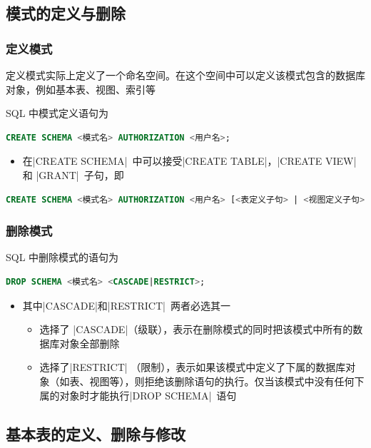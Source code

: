 \subsection{模式的定义与删除}

\subsubsection{定义模式}
定义模式实际上定义了一个命名空间。在这个空间中可以定义该模式包含的数据库对象，例如基本表、视图、索引等

SQL 中模式定义语句为
\begin{lstlisting}[language=sql]
CREATE SCHEMA <模式名> AUTHORIZATION <用户名>;
\end{lstlisting}
\begin{itemize}
    \item 在\sverb|CREATE SCHEMA|\ 中可以接受\sverb|CREATE TABLE|，\sverb|CREATE VIEW| 和 \sverb|GRANT|\ 子句，即
\end{itemize}
\begin{lstlisting}[language=sql]
CREATE SCHEMA <模式名> AUTHORIZATION <用户名> [<表定义子句> | <视图定义子句> | <授权定义子句>]
\end{lstlisting}

\subsubsection{删除模式}
SQL 中删除模式的语句为
\begin{lstlisting}[language=sql]
DROP SCHEMA <模式名> <CASCADE|RESTRICT>;
\end{lstlisting}

\begin{itemize}
    \item 其中\sverb|CASCADE|和\sverb|RESTRICT|\ 两者必选其一
    \begin{itemize}
        \item 选择了 \sverb|CASCADE|（级联），表示在删除模式的同时把该模式中所有的数据库对象全部删除
        \item 选择了\sverb|RESTRICT| （限制），表示如果该模式中定义了下属的数据库对象（如表、视图等），则拒绝该删除语句的执行。仅当该模式中没有任何下属的对象时才能执行\sverb|DROP SCHEMA|\ 语句
    \end{itemize}
\end{itemize}

\subsection{基本表的定义、删除与修改}

